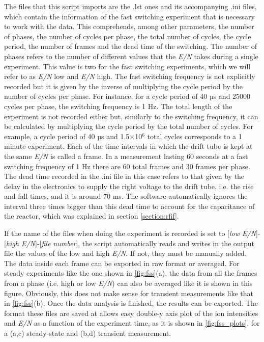 The files that this script imports are the .lst ones and its accompanying .ini files, which contain the information of the fast switching experiment that is necessary to work with the data.
This  comprehends, among other parameters,
the number of phases,
the number of cycles per phase,
the total number of cycles,
the cycle period,
the number of frames
and
the dead time of the switching.
The number of phases refers to the number of different values that the \textit{E/N} takes during a single experiment. This value is two for the fast switching experiments, which we will refer to as \textit{E/N} low  and \textit{E/N} high.
%
The fast switching frequency is not explicitly recorded but it is given by the inverse of multiplying the cycle period by the number of cycles per phase. For instance, for a cycle period of 40 µs and 25000 cycles per phase, the switching frequency is 1 Hz.
%
The total length of the experiment is not recorded either but, similarly to the switching frequency, it can be calculated by multiplying the cycle period by the total number of cycles. For example, a cycle period of 40 µs and 1.5$\times$10$^6$ total cycles corresponds to a 1 minute experiment.
%
%
Each of the time intervals in which the drift tube is kept at the same \textit{E/N} is called a frame. In a measurement lasting 60 seconds at a fast switching frequency of 1 Hz there are 60 total frames and 30 frames per phase.
%
%
The dead time recorded in the .ini file in this case refers to that given by the delay in the electronics to supply the right voltage to the drift tube, i.e. the rise and fall times, and it is around 70 ms. The software automatically ignores the interval three times bigger than this dead time to account for the capacitance of the reactor, which was explained  in section \ref{section:rfif}.




If the name of the files when doing the experiment is recorded is set to [\textit{low E/N}]-[\textit{high E/N}]-[\textit{file number}], the script automatically reads and writes in the output file the values of the low and high \textit{E/N}. If not, they must be manually added.
%
The data inside each frame can be exported in raw format or averaged.
For steady experiments like the one shown in \autoref{fig:fss}(a), the data from all the frames from a phase (i.e. high or low \textit{E/N}) can also be averaged like it is shown in this figure. Obviously, this does not make sense for transient measurements like that in \autoref{fig:fss}(b).
%
Once the data analysis is finished, the results can be exported. The format these files are saved at allows easy double-y axis plot of the ion intensities and \textit{E/N} as a function of the experiment time, as it is shown in \autoref{fig:fss_plots}, for a (a,c) steady-state  and (b,d) transient measurement.




